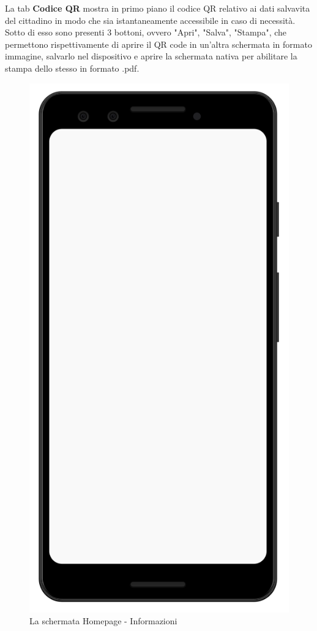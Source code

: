 \documentclass[12pt,a4paper,twoside,openright,titlepage]{book}
\begin{document}
La tab \textbf{Codice QR} mostra in primo piano il codice QR relativo ai dati salvavita del cittadino in modo che sia istantaneamente accessibile in caso di necessità. Sotto di esso sono presenti 3 bottoni, ovvero "Apri", "Salva", "Stampa", che permettono rispettivamente di aprire il QR code in un'altra schermata in formato immagine, salvarlo nel dispositivo e aprire la schermata nativa per abilitare la stampa dello stesso in formato .pdf.

\begin{figure}[H]
\centering
\includegraphics[scale = 0.2]{mobile}
\caption{La schermata Homepage - Informazioni}
\end{figure}
\end{document}
